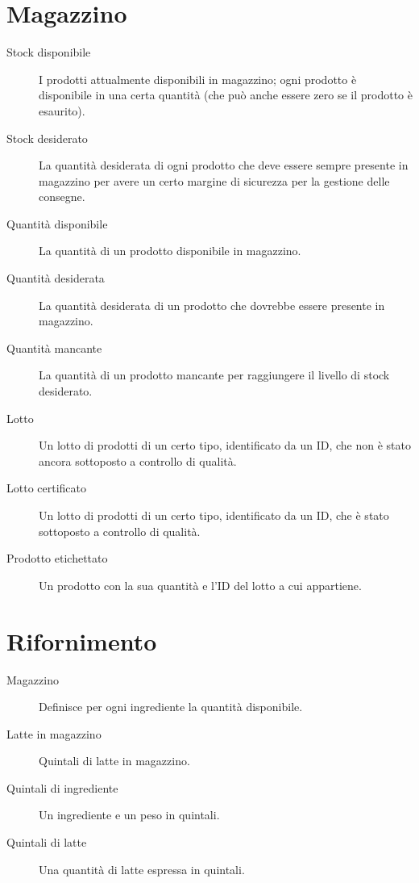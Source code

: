 \section{Magazzino}
\begin{description}
    \item [Stock disponibile] I prodotti attualmente disponibili in magazzino; ogni prodotto è disponibile in una certa quantità (che può anche essere zero se il prodotto è esaurito).
    \item [Stock desiderato] La quantità desiderata di ogni prodotto che deve essere sempre presente in magazzino per avere un certo margine di sicurezza per la gestione delle consegne.
    \item [Quantità disponibile] La quantità di un prodotto disponibile in magazzino.
    \item [Quantità desiderata] La quantità desiderata di un prodotto che dovrebbe essere presente in magazzino.
    \item [Quantità mancante] La quantità di un prodotto mancante per raggiungere il livello di stock desiderato.
    \item [Lotto] Un lotto di prodotti di un certo tipo, identificato da un ID, che non è stato ancora sottoposto a controllo di qualità.
    \item [Lotto certificato] Un lotto di prodotti di un certo tipo, identificato da un ID, che è stato sottoposto a controllo di qualità.
    \item [Prodotto etichettato] Un prodotto con la sua quantità e l'ID del lotto a cui appartiene.
\end{description}

\section{Rifornimento}
\begin{description}
    \item[Magazzino] Definisce per ogni ingrediente la quantità disponibile.
    \item[Latte in magazzino] Quintali di latte in magazzino.
    \item[Quintali di ingrediente] Un ingrediente e un peso in quintali.
    \item[Quintali di latte] Una quantità di latte espressa in quintali.
\end{description}

